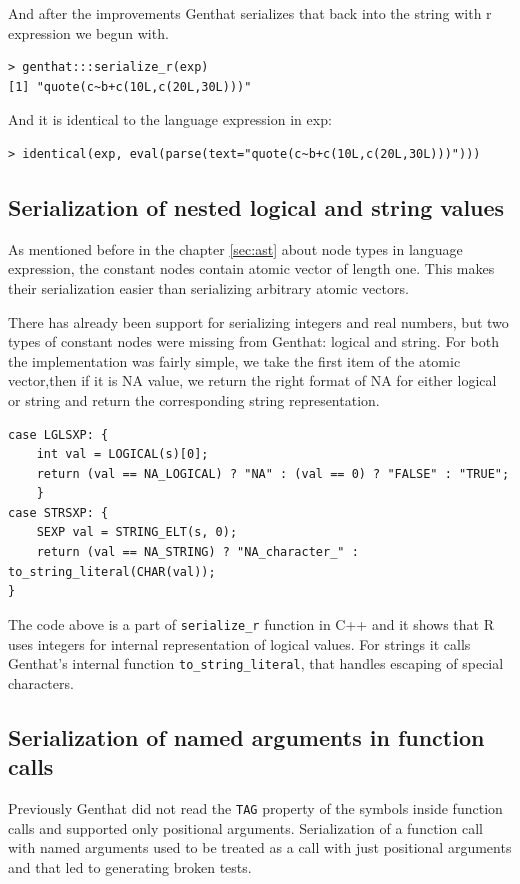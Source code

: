 \documentclass[thesis=B,english]{FITthesis}[2012/10/20]
\begin{document}
And after the improvements Genthat serializes that back into the string with r expression we begun with.

\begin{verbatim}
> genthat:::serialize_r(exp)
[1] "quote(c~b+c(10L,c(20L,30L)))"
\end{verbatim}

And it is identical to the language expression in exp:

\begin{verbatim}
> identical(exp, eval(parse(text="quote(c~b+c(10L,c(20L,30L)))")))
\end{verbatim}


\subsection{Serialization of nested logical and string values}

As mentioned before in the chapter \ref{sec:ast} about node types in language expression, the constant nodes contain atomic vector of length one. This makes their serialization easier than serializing arbitrary atomic vectors.

There has already been support for serializing integers and real numbers, but two types of constant nodes were missing from Genthat: logical and string. For both the implementation was fairly simple, we take the first item of the atomic vector,then if it is NA value, we return the right format of NA for either logical or string and return the corresponding string representation.

\begin{verbatim}
case LGLSXP: {
    int val = LOGICAL(s)[0];
    return (val == NA_LOGICAL) ? "NA" : (val == 0) ? "FALSE" : "TRUE";
    }
case STRSXP: {
    SEXP val = STRING_ELT(s, 0);
    return (val == NA_STRING) ? "NA_character_" : to_string_literal(CHAR(val));
}
\end{verbatim}

The code above is a part of \verb|serialize_r| function in C++ and it shows that R uses integers for internal representation of logical values. For strings it calls Genthat’s internal function \verb|to_string_literal|, that handles escaping of special characters.

\subsection{Serialization of named arguments in function calls}
Previously Genthat did not read the \verb|TAG| property of the symbols inside function calls and supported only positional arguments. Serialization of a function call with named arguments used to be treated as a call with just positional arguments and that led to generating broken tests.
\end{document}
